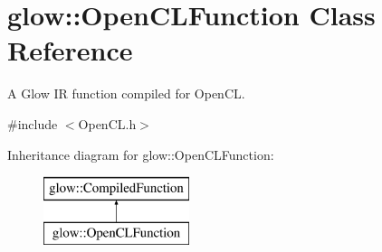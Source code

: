 \hypertarget{classglow_1_1_open_c_l_function}{}\section{glow\+:\+:Open\+C\+L\+Function Class Reference}
\label{classglow_1_1_open_c_l_function}


A Glow IR function compiled for Open\+CL.  




{\ttfamily \#include $<$Open\+C\+L.\+h$>$}

Inheritance diagram for glow\+:\+:Open\+C\+L\+Function\+:\begin{figure}[H]
\begin{center}
\leavevmode
\includegraphics[height=2.000000cm]{classglow_1_1_open_c_l_function}
\end{center}
\end{figure}
